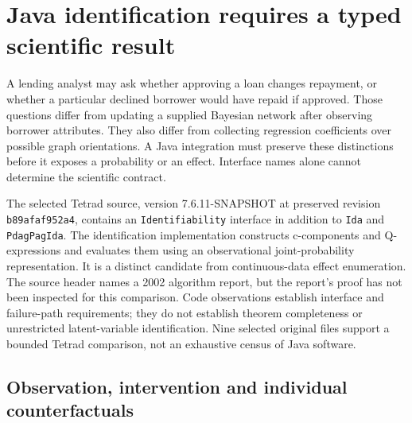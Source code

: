 \section{Java identification requires a typed scientific result}
\label{exec19:javaid-scope}

A lending analyst may ask whether approving a loan changes repayment, or whether
a particular declined borrower would have repaid if approved. Those questions
differ from updating a supplied Bayesian network after observing borrower
attributes. They also differ from collecting regression coefficients over
possible graph orientations. A Java integration must preserve these distinctions
before it exposes a probability or an effect. Interface names alone cannot
determine the scientific contract.

The selected Tetrad source, version 7.6.11-SNAPSHOT at preserved revision
\texttt{b89afaf952a4}, contains an \texttt{Identifiability} interface in addition
to \texttt{Ida} and \texttt{PdagPagIda}. The identification implementation
constructs c-components and Q-expressions and evaluates them using an
observational joint-probability representation. It is a distinct candidate
from continuous-data effect enumeration. The source header names a 2002
algorithm report, but the report's proof has not been inspected for this
comparison. Code observations establish interface and failure-path requirements;
they do not establish theorem completeness or unrestricted latent-variable
identification. Nine selected original files support a bounded Tetrad comparison,
not an exhaustive census of Java software.\citep{exec19_javaid_source}

\subsection{Observation, intervention and individual counterfactuals}
\label{exec19:javaid-witnesses}

